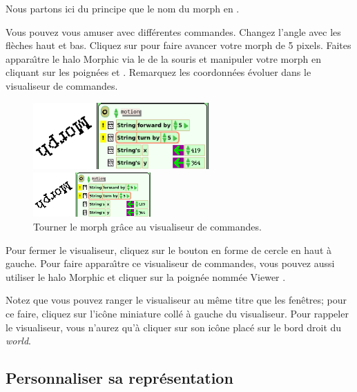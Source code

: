 \documentclass[a4paper,10pt,twoside]{book}
\begin{document}
Nous partons ici du principe que le nom du morph en .


Vous pouvez vous amuser avec diff\'erentes commandes. Changez l'angle
avec les fl\`eches haut et bas. Cliquez sur 
pour faire avancer votre morph de 5 pixels. Faites appara\^{\i}tre le halo
Morphic via le  de la souris et manipuler votre
morph en cliquant sur les poign\'ees \grabHandle{} et \rotateHandle{}.
Remarquez les coordonn\'ees \'evoluer dans le visualiseur de commandes.

\begin{figure}[ht]
	\ifluluelse
		{\centerline{\includegraphics[width=0.6\textwidth]{turningInViewer}}}
		{\centerline{\includegraphics[width=0.4\textwidth]{turningInViewer}}}
	\caption{Tourner le morph gr\^ace au visualiseur de commandes.\label{fig:turningInViewer}}
\end{figure}

Pour fermer le visualiseur, cliquez sur le bouton en forme de cercle
en haut \`a gauche. Pour faire appara\^{\i}tre ce visualiseur de
commandes, vous pouvez aussi utiliser le halo Morphic et cliquer sur
la poign\'ee nomm\'ee Viewer \viewerHandle{}.
   
Notez que vous pouvez ranger le visualiseur au m\^eme titre que les
fen\^etres; pour ce faire, cliquez sur l'ic\^one miniature coll\'e \`a
gauche du visualiseur. Pour rappeler le visualiseur, vous n'aurez
qu'\`a cliquer sur son ic\^one plac\'e sur le bord droit du \emph{world}.

\subsection{Personnaliser sa repr\'esentation}
\end{document}
